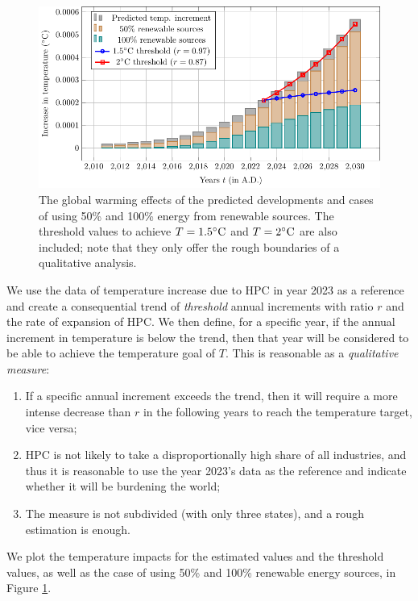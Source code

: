 \documentclass[12pt]{article}
\begin{document}
\begin{figure}[!b]
	\centering
	\includegraphics{figures/impact/temp_i.pdf}
	\caption{The global warming effects of the predicted developments and cases of using 50\% and 100\% energy from renewable sources. The threshold values to achieve $T = 1.5 \rm ^\circ C$ and $T = 2 \rm ^\circ C$ are also included; note that they only offer the rough boundaries of a qualitative analysis.}
	\label{fig_warming_final}
\end{figure}

We use the data of temperature increase due to HPC in year 2023 as a reference and create a consequential trend of \textit{threshold} annual increments with ratio $r$ and the rate of expansion of HPC. We then define, for a specific year, if the annual increment in temperature is below the trend, then that year will be considered to be able to achieve the temperature goal of $T$. This is reasonable as a \textit{qualitative measure}:
\begin{enumerate}
	\item If a specific annual increment exceeds the trend, then it will require a more intense decrease than $r$ in the following years to reach the temperature target, vice versa;
	\item HPC is not likely to take a disproportionally high share of all industries, and thus it is reasonable to use the year 2023's data as the reference and indicate whether it will be burdening the world;
	\item The measure is not subdivided (with only three states), and a rough estimation is enough.
\end{enumerate}

We plot the temperature impacts for the estimated values and the threshold values, as well as the case of using 50\% and 100\% renewable energy sources, in Figure \ref{fig_warming_final}. 
\end{document}
